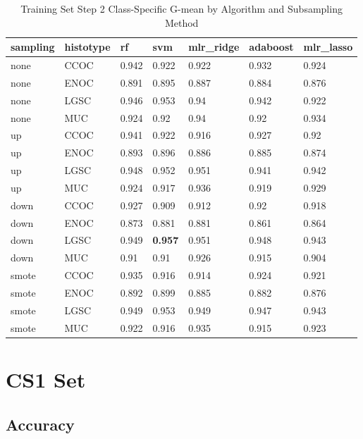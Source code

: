 \documentclass[
]{report}
\begin{document}
\begin{table}

\caption{\label{tab:train-step2-gmean-class-table}Training Set Step 2 Class-Specific G-mean by Algorithm and Subsampling Method}
\centering
\begin{tabular}[t]{l|l|l|l|l|l|l}
\hline
sampling & histotype & rf & svm & mlr\_ridge & adaboost & mlr\_lasso\\
\hline
none & CCOC & 0.942 & 0.922 & 0.922 & 0.932 & 0.924\\
\hline
none & ENOC & 0.891 & 0.895 & 0.887 & 0.884 & 0.876\\
\hline
none & LGSC & 0.946 & 0.953 & 0.94 & 0.942 & 0.922\\
\hline
none & MUC & 0.924 & 0.92 & 0.94 & 0.92 & 0.934\\
\hline
up & CCOC & 0.941 & 0.922 & 0.916 & 0.927 & 0.92\\
\hline
up & ENOC & 0.893 & 0.896 & 0.886 & 0.885 & 0.874\\
\hline
up & LGSC & 0.948 & 0.952 & 0.951 & 0.941 & 0.942\\
\hline
up & MUC & 0.924 & 0.917 & 0.936 & 0.919 & 0.929\\
\hline
down & CCOC & 0.927 & 0.909 & 0.912 & 0.92 & 0.918\\
\hline
down & ENOC & 0.873 & 0.881 & 0.881 & 0.861 & 0.864\\
\hline
down & LGSC & 0.949 & \textbf{0.957} & 0.951 & 0.948 & 0.943\\
\hline
down & MUC & 0.91 & 0.91 & 0.926 & 0.915 & 0.904\\
\hline
smote & CCOC & 0.935 & 0.916 & 0.914 & 0.924 & 0.921\\
\hline
smote & ENOC & 0.892 & 0.899 & 0.885 & 0.882 & 0.876\\
\hline
smote & LGSC & 0.949 & 0.953 & 0.949 & 0.947 & 0.943\\
\hline
smote & MUC & 0.922 & 0.916 & 0.935 & 0.915 & 0.923\\
\hline
\end{tabular}
\end{table}

\hypertarget{cs1-set}{%
\section{CS1 Set}\label{cs1-set}}

\hypertarget{accuracy-2}{%
\subsection{Accuracy}\label{accuracy-2}}
\end{document}
